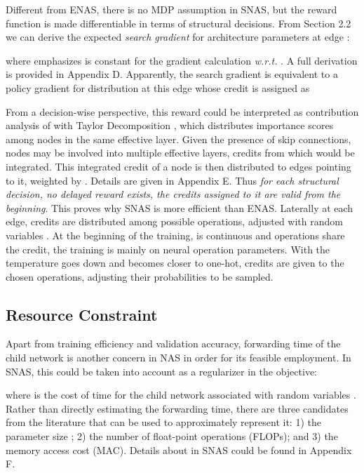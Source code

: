 \documentclass{article} \usepackage{iclr2019_conference,times}
\begin{document}
Different from ENAS, there is no MDP assumption in SNAS, but the reward function is made differentiable in terms of structural decisions. From Section 2.2 we can derive the expected \textit{search gradient} for architecture parameters at edge :

where  emphasizes  is constant for the gradient calculation \textit{w.r.t.} . A full derivation is provided in Appendix D. Apparently, the search gradient is equivalent to a policy gradient for distribution at this edge whose credit is assigned as 


From a decision-wise perspective, this reward could be interpreted as contribution analysis of  with Taylor Decomposition \citep{montavon2017explaining}, which distributes importance scores among nodes in the same effective layer. Given the presence of skip connections, nodes may be involved into multiple effective layers, credits from which would be integrated. This integrated credit of a node  is then distributed to edges  pointing to it, weighted by . Details are given in Appendix E. Thus \textit{for each structural decision, no delayed reward exists, the credits assigned to it are valid from the beginning}. This proves why SNAS is more efficient than ENAS. Laterally at each edge, credits are distributed among possible operations, adjusted with random variables . At the beginning of the training,  is continuous and operations share the credit, the training is mainly on neural operation parameters. With the temperature goes down and  becomes closer to one-hot, credits are given to the chosen operations, adjusting their probabilities to be sampled. 

\subsection{Resource Constraint}
Apart from training efficiency and validation accuracy, forwarding time of the child network is another concern in NAS in order for its feasible employment. In SNAS, this could be taken into account as a regularizer in the objective:

where  is the cost of time for the child network associated with random variables . Rather than directly estimating the forwarding time, there are three candidates from the literature \citep{gordon2018morphnet, ma2018shufflenet} that can be used to approximately represent it: 1) the parameter size ; 2) the number of float-point operations (FLOPs); and 3) the memory access cost (MAC). Details about  in SNAS could be found in Appendix F. 
\end{document}
